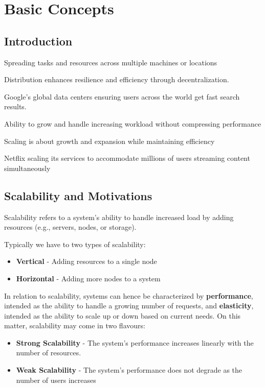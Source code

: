\chapter{Basic Concepts}

\section{Introduction}
\begin{definition}[Distributed]
   Spreading tasks and resources across multiple machines or locations
\end{definition}

Distribution enhances resilience and efficiency through decentralization.

\begin{example}
   Google's global data centers ensuring users across the world get fast search results.
\end{example}

\begin{definition}[Scalable]
   Ability to grow and handle increasing workload without compressing performance
\end{definition}

Scaling is about growth and expansion while maintaining efficiency

\begin{example}
   Netflix scaling its services to accommodate millions of users streaming content simultaneously
\end{example}

\section{Scalability and Motivations}
Scalability refers to a system's ability to handle increased load by adding resources (e.g., servers, nodes, or storage).
{Typically we have to two types of scalability:\ns
\begin{itemize}
   \item \textbf{Vertical} - Adding resources to a single node
   \item \textbf{Horizontal} - Adding more nodes to a system
\end{itemize}}

In relation to scalability, systems can hence be characterized by \textbf{performance}, intended as the ability to handle a growing number of requests, and \textbf{elasticity}, intended as the ability to scale up or down based on current needs.
On this matter, scalability may come in two flavours:
\begin{itemize}
   \item \textbf{Strong Scalability} - The system's performance increases linearly with the number of resources.
   \item \textbf{Weak Scalability} - The system's performance does not degrade as the number of users increases
\end{itemize}

